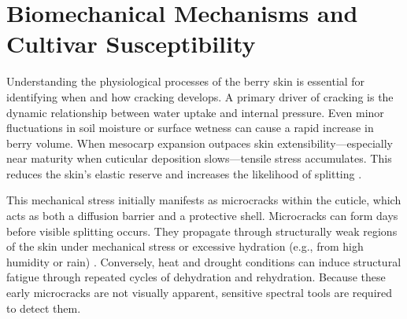 \section{Biomechanical Mechanisms and Cultivar Susceptibility}

\medskip
\noindent
Understanding the physiological processes of the berry skin is essential for identifying when and how cracking develops. A primary driver of cracking is the dynamic relationship between water uptake and internal pressure. Even minor fluctuations in soil moisture or surface wetness can cause a rapid increase in berry volume. When mesocarp expansion outpaces skin extensibility---especially near maturity when cuticular deposition slows---tensile stress accumulates. This reduces the skin's elastic reserve and increases the likelihood of splitting \parencite{Khadivi2014}. 

\medskip
\noindent
This mechanical stress initially manifests as microcracks within the cuticle, which acts as both a diffusion barrier and a protective shell. Microcracks can form days before visible splitting occurs. They propagate through structurally weak regions of the skin under mechanical stress or excessive hydration (e.g., from high humidity or rain) \parencite{Peschel2005, Emmons1998, Chang2021}. Conversely, heat and drought conditions can induce structural fatigue through repeated cycles of dehydration and rehydration. Because these early microcracks are not visually apparent, sensitive spectral tools are required to detect them. 

\medskip
\noindent

